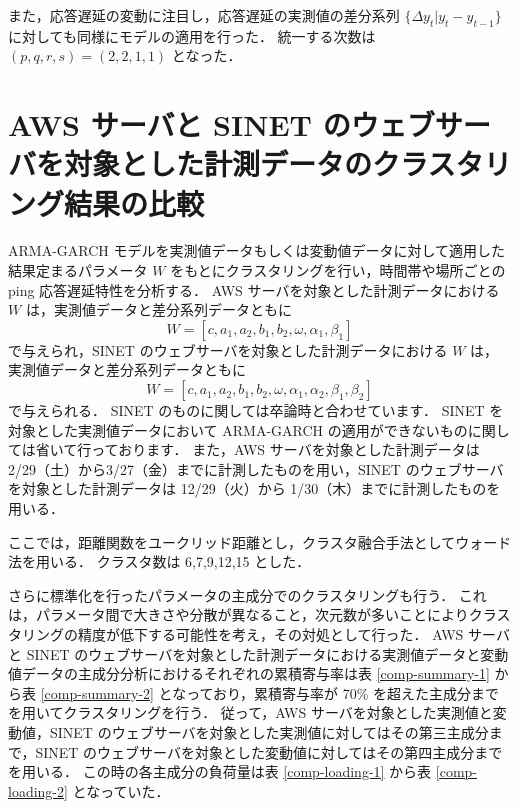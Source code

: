 \documentclass[a4j]{jarticle}
\begin{document}
また，応答遅延の変動に注目し，応答遅延の実測値の差分系列 $\{\Delta y_t | y_t - y_{t-1}\}$ に対しても同様にモデルの適用を行った．
統一する次数は $(p,q,r,s) = (2,2,1,1)$ となった．


\section{AWS サーバと SINET のウェブサーバを対象とした計測データのクラスタリング結果の比較}
 ARMA-GARCH モデルを実測値データもしくは変動値データに対して適用した結果定まるパラメータ $W$ をもとにクラスタリングを行い，時間帯や場所ごとの ping 応答遅延特性を分析する．
AWS サーバを対象とした計測データにおける $W$ は，実測値データと差分系列データともに
$$W = [c, a_1, a_2, b_1, b_2, \omega, \alpha_1, \beta_1] $$
で与えられ，SINET のウェブサーバを対象とした計測データにおける $W$ は，実測値データと差分系列データともに
$$W = [c, a_1, a_2, b_1, b_2, \omega, \alpha_1, \alpha_2, \beta_1, \beta_2] $$
で与えられる．
SINET のものに関しては卒論時と合わせています．
SINET を対象とした実測値データにおいて ARMA-GARCH の適用ができないものに関しては省いて行っております．
また，AWS サーバを対象とした計測データは 2/29（土）から3/27（金）までに計測したものを用い，SINET のウェブサーバを対象とした計測データは 12/29（火）から 1/30（木）までに計測したものを用いる．

ここでは，距離関数をユークリッド距離とし，クラスタ融合手法としてウォード法を用いる．
クラスタ数は 6,7,9,12,15 とした．

さらに標準化を行ったパラメータの主成分でのクラスタリングも行う．
これは，パラメータ間で大きさや分散が異なること，次元数が多いことによりクラスタリングの精度が低下する可能性を考え，その対処として行った．
AWS サーバと SINET のウェブサーバを対象とした計測データにおける実測値データと変動値データの主成分分析におけるそれぞれの累積寄与率は表 \ref{comp-summary-1} から表 \ref{comp-summary-2} となっており，累積寄与率が 70\% を超えた主成分までを用いてクラスタリングを行う．
従って，AWS サーバを対象とした実測値と変動値，SINET のウェブサーバを対象とした実測値に対してはその第三主成分まで，SINET のウェブサーバを対象とした変動値に対してはその第四主成分までを用いる．
この時の各主成分の負荷量は表 \ref{comp-loading-1} から表 \ref{comp-loading-2} となっていた．
\end{document}
